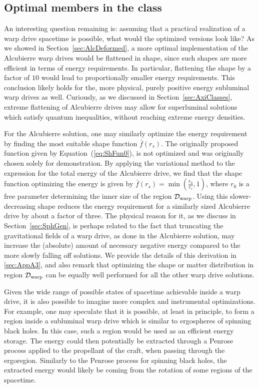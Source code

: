\documentclass[10pt]{iopart}
\begin{document}
\subsection{Optimal members in the class}

An interesting question remaining is: assuming that a practical realization of a warp drive spacetime is possible, what would the optimized versions look like? As we showed in Section~\ref{sec:AlcDeformed}, a more optimal implementation of the Alcubierre warp drives would be flattened in shape, since such shapes are more efficient in terms of energy requirements. In particular, flattening the shape by a factor of $10$ would lead to proportionally smaller energy requirements. This conclusion likely holds for the, more physical, purely positive energy subluminal warp drives as well. Curiously, as we discussed in Section~\ref{sec:AxiClasses}, extreme flattening of Alcubierre drives may allow for superluminal solutions which satisfy quantum inequalities, without reaching extreme energy densities.

For the Alcubierre solution, one may similarly optimize the energy requirement by finding the most suitable shape function $\bar{f}(r_s)$. The originally proposed function given by Equation~(\ref{eq:ShFun0}), is not optimized and was originally chosen solely for demonstration. By applying the variational method to the expression for the total energy of the Alcubierre drive, we find that the shape function optimizing the energy is given by $\bar{f}(r_s)=\min(\frac{r_0}{r_s},1)$, where $r_0$ is a free parameter determining the inner size of the region $\mathcal{D}_{\rm warp}$. Using this slower-decreasing shape reduces the energy requirement for a similarly sized Alcubierre drive by about a factor of three. The physical reason for it, as we discuss in Section~\ref{sec:SphGen}, is perhaps related to the fact that truncating the gravitational fields of a warp drive, as done in the Alcubierre solution, may increase the (absolute) amount of necessary negative energy compared to the more slowly falling off solutions. We provide the details of this derivation in \ref{sec:AppA3}, and also remark that optimizing the shape or matter distribution in region $\mathcal{D}_{\rm warp}$ can be equally well performed for all the other warp drive solutions.

Given the wide range of possible states of spacetime achievable inside a warp drive, it is also possible to imagine more complex and instrumental optimizations. For example, one may speculate that it is possible, at least in principle, to form a region inside a subluminal warp drive which is similar to ergospheres of spinning black holes. In this case, such a region would be used as an efficient energy storage. The energy could then potentially be extracted through a Penrose process applied to the propellant of the craft, when passing through the ergoregion. Similarly to the Penrose process for spinning black holes, the extracted energy would likely be coming from the rotation of some regions of the spacetime.
\end{document}

